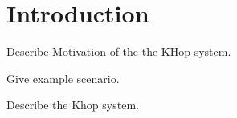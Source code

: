 

\section{Introduction}

Describe Motivation of the the KHop system.

Give example scenario.

Describe the Khop system.


